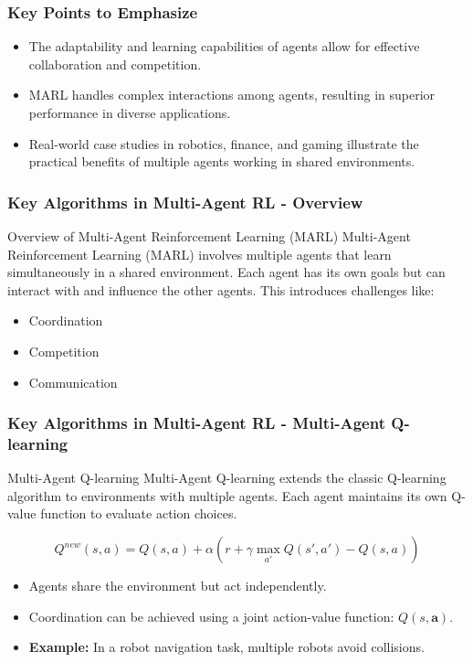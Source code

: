 \documentclass[aspectratio=169]{beamer}
\begin{document}
\begin{frame}[fragile]
    \frametitle{Key Points to Emphasize}
    \begin{itemize}
        \item The adaptability and learning capabilities of agents allow for effective collaboration and competition.
        \item MARL handles complex interactions among agents, resulting in superior performance in diverse applications.
        \item Real-world case studies in robotics, finance, and gaming illustrate the practical benefits of multiple agents working in shared environments.
    \end{itemize}
\end{frame}

\begin{frame}[fragile]
    \frametitle{Key Algorithms in Multi-Agent RL - Overview}
    \begin{block}{Overview of Multi-Agent Reinforcement Learning (MARL)}
        Multi-Agent Reinforcement Learning (MARL) involves multiple agents that learn simultaneously in a shared environment.
        Each agent has its own goals but can interact with and influence the other agents. This introduces challenges like:
    \end{block}
    \begin{itemize}
        \item Coordination
        \item Competition
        \item Communication
    \end{itemize}
\end{frame}

\begin{frame}[fragile]
    \frametitle{Key Algorithms in Multi-Agent RL - Multi-Agent Q-learning}
    \begin{block}{Multi-Agent Q-learning}
        Multi-Agent Q-learning extends the classic Q-learning algorithm to environments with multiple agents. Each agent maintains its own Q-value function to evaluate action choices.
    \end{block}
    \begin{equation}
    Q^{new}(s, a) = Q(s, a) + \alpha \left( r + \gamma \max_{a'} Q(s', a') - Q(s, a) \right)
    \end{equation}
    \begin{itemize}
        \item Agents share the environment but act independently.
        \item Coordination can be achieved using a joint action-value function: \( Q(s, \mathbf{a}) \).
        \item \textbf{Example:} In a robot navigation task, multiple robots avoid collisions.
    \end{itemize}
\end{frame}
\end{document}
